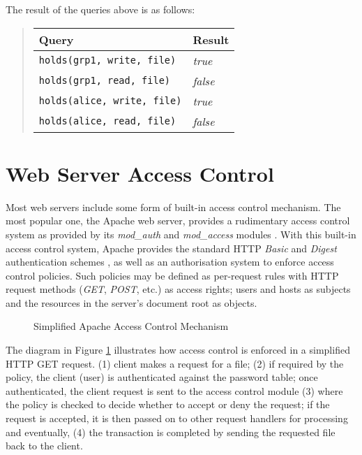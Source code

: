 \documentclass[11pt]{llncs}
\begin{document}
    \noindent The result of the queries above is as follows:

    \begin{quote}
      \begin{tabular}[t]{|l|l|}
        \hline
        {\bf Query} & {\bf Result} \\
        \hline
        {\tt holds(grp1, write, file)} & {\em true} \\
        \hline
        {\tt holds(grp1, read, file)} & {\em false} \\
        \hline
        {\tt holds(alice, write, file)} & {\em true} \\
        \hline
        {\tt holds(alice, read, file)} & {\em false} \\
        \hline
      \end{tabular}
    \end{quote}

  \section{Web Server Access Control}
    \label{webserver}

    Most web servers include some form of built-in access control mechanism.
    The most popular one, the Apache web server, provides a rudimentary access
    control system as provided by its {\em mod\_auth} and {\em mod\_access}
    modules \cite{AP,LAU}. With this built-in access control system, Apache
    provides the standard HTTP {\em Basic} and {\em Digest} authentication
    schemes \cite{HTTP2}, as well as an authorisation system to enforce
    access control policies. Such policies may be defined as per-request
    rules with HTTP request methods ({\em GET}, {\em POST}, etc.) \cite{HTTP1}
    as access rights; users and hosts as subjects and the resources in the
    server's document root as objects.

    \begin{figure}[ht]
      \begin{center}
        \caption{Simplified Apache Access Control Mechanism}
        \label{fig-2}
      \end{center}
    \end{figure}

    The diagram in Figure \ref{fig-2} illustrates how access control is
    enforced in a simplified HTTP GET request. (1) client makes a request for a
    file; (2) if required by the policy, the client (user) is authenticated
    against the password table; once authenticated, the client request is sent
    to the access control module (3) where the policy is checked to decide
    whether to accept or deny the request; if the request is accepted, it is
    then passed on to other request handlers for processing and eventually,
    (4) the transaction is completed by sending the requested file back to
    the client.
\end{document}
